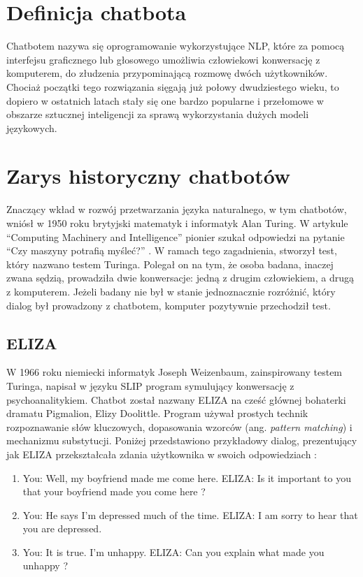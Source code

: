     \section{Definicja chatbota}
    Chatbotem nazywa się oprogramowanie wykorzystujące NLP, które za pomocą interfejsu graficznego lub głosowego umożliwia człowiekowi konwersację z komputerem, do złudzenia przypominającą rozmowę dwóch użytkowników. Chociaż początki tego rozwiązania sięgają już połowy dwudziestego wieku, to dopiero w ostatnich latach stały się one bardzo popularne i przełomowe w obszarze sztucznej inteligencji za sprawą wykorzystania dużych modeli językowych.
    
    
    \section{Zarys historyczny chatbotów}
    Znaczący wkład w rozwój przetwarzania języka naturalnego, w tym chatbotów, wniósł w 1950 roku brytyjski matematyk i informatyk Alan Turing. W artykule \enquote{Computing Machinery and Intelligence} pionier szukał odpowiedzi na pytanie \enquote{Czy maszyny potrafią myśleć?} \cite{turing1950}. W ramach tego zagadnienia, stworzył test, który nazwano testem Turinga. Polegał on na tym, że osoba badana, inaczej zwana sędzią, prowadziła dwie konwersacje: jedną z drugim człowiekiem, a drugą z komputerem. Jeżeli badany nie był w stanie jednoznacznie rozróżnić, który dialog był prowadzony z chatbotem, komputer pozytywnie przechodził test.

    
        \subsection{ELIZA}
        W 1966 roku niemiecki informatyk Joseph Weizenbaum, zainspirowany testem Turinga, napisał w języku SLIP program symulujący konwersację z psychoanalitykiem. Chatbot został nazwany ELIZA na cześć głównej bohaterki dramatu Pigmalion, Elizy Doolittle. Program używał prostych technik rozpoznawanie słów kluczowych, dopasowania wzorców (ang. \textit{pattern matching}) i mechanizmu substytucji. Poniżej przedstawiono przykładowy dialog, prezentujący jak ELIZA przekształcała zdania użytkownika w swoich odpowiedziach \cite{from_eliza_to_chatgpt2024}:

        \begin{enumerate}
            \item You: Well, my boyfriend made me come here.\newline
                ELIZA: Is it important to you that your boyfriend made you come here ?
            \item You: He says I'm depressed much of the time.\newline
                ELIZA: I am sorry to hear that you are depressed.
            \item You: It is true. I'm unhappy.\newline
                ELIZA: Can you explain what made you unhappy ?
        \end{enumerate}

